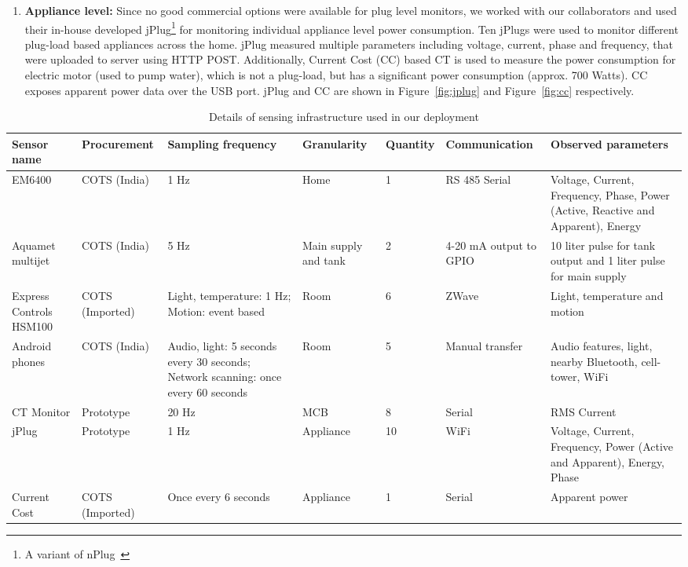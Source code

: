 \documentclass[10pt]{sensys-proc}
\newcommand{\figref}[1]{Figure~\ref{#1}}
\begin{document}
\begin{enumerate}[leftmargin=1em]
\vspace{-1.5mm} \item \textbf{Appliance level:} Since no good commercial options were available for plug level monitors, we worked with our collaborators and used their in-house developed jPlug\footnote{A variant of nPlug~\cite{nplug}} for monitoring individual appliance level power consumption. Ten jPlugs were used to monitor different plug-load based appliances across the home. 
jPlug measured multiple parameters including voltage, current, phase and frequency, that were uploaded to server using HTTP POST. Additionally, Current Cost (CC) based CT is used to measure the power consumption for electric motor (used to pump water), which is not a plug-load, but has a significant power consumption (approx. 700 Watts). CC exposes apparent power data over the USB port.  jPlug and CC are shown in \figref{fig:jplug} and \figref{fig:cc} respectively.
\end{enumerate}
\begin{table}[t!]
\footnotesize
\centering
\vspace{-6mm}
\caption{Details of sensing infrastructure used in our deployment}
\vspace{-4mm}
\label{tab:sensing}
\tabcolsep=0.015cm
\begin{center}
\begin{tabular}{|p{1.7cm}|p{2.0cm}|p{3.3cm}|p{1.5cm}|p{1.5cm}|p{2.0cm}|p{5.2cm}|}
\hline
\textbf{Sensor name} & \textbf{Procurement} & \textbf{Sampling frequency} & \textbf{Granularity} & \textbf{Quantity} & \textbf{Communication} & \textbf{Observed parameters}\\
\hline

EM6400& COTS (India)&1 Hz&Home&1&RS 485 Serial&Voltage, Current, Frequency, Phase, Power (Active, Reactive and Apparent), Energy\\ \hline
Aquamet multijet & COTS (India) &5 Hz&Main supply and tank&2&4-20 mA output to GPIO &10 liter pulse for tank output and 1 liter pulse for main supply\\ \hline
Express Controls HSM100 &COTS (Imported)&Light, temperature: 1 Hz; Motion: event based &Room &6&ZWave&Light, temperature and motion\\ \hline
Android phones &COTS (India) & Audio, light: 5 seconds every 30 seconds; Network scanning: once every 60 seconds&Room&5&Manual transfer&Audio features, light, nearby Bluetooth, cell-tower, WiFi\\ \hline
CT Monitor&Prototype &20 Hz&MCB&8&Serial&RMS Current \\\hline
jPlug& Prototype &1 Hz &Appliance&10&WiFi&Voltage, Current, Frequency, Power (Active and Apparent), Energy, Phase\\ \hline	
Current Cost&COTS (Imported)& Once every 6 seconds &Appliance&1&Serial&Apparent power\\ \hline
\end{tabular}
\end{center}
\vspace{-6mm}
\end{table}
\end{document}
